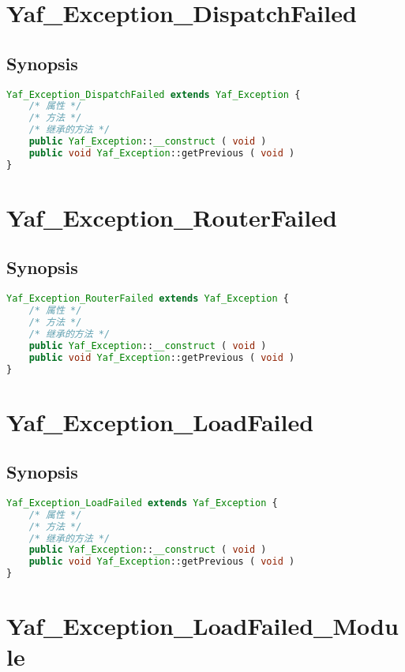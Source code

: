 \chapter{Yaf\_Exception\_DispatchFailed}


\section{Synopsis}


\begin{lstlisting}[language=PHP]
Yaf_Exception_DispatchFailed extends Yaf_Exception {
    /* 属性 */
    /* 方法 */
    /* 继承的方法 */
    public Yaf_Exception::__construct ( void )
    public void Yaf_Exception::getPrevious ( void )
}
\end{lstlisting}

\chapter{Yaf\_Exception\_RouterFailed}


\section{Synopsis}

\begin{lstlisting}[language=PHP]
Yaf_Exception_RouterFailed extends Yaf_Exception {
    /* 属性 */
    /* 方法 */
    /* 继承的方法 */
    public Yaf_Exception::__construct ( void )
    public void Yaf_Exception::getPrevious ( void )
}
\end{lstlisting}

\chapter{Yaf\_Exception\_LoadFailed}


\section{Synopsis}


\begin{lstlisting}[language=PHP]
Yaf_Exception_LoadFailed extends Yaf_Exception {
    /* 属性 */
    /* 方法 */
    /* 继承的方法 */
    public Yaf_Exception::__construct ( void )
    public void Yaf_Exception::getPrevious ( void )
}
\end{lstlisting}

\chapter{Yaf\_Exception\_LoadFailed\_Module}



